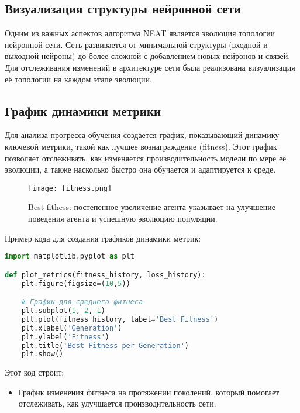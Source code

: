\documentclass[a4paper,12pt]{article}
\begin{document}
\subsection{Визуализация структуры нейронной сети}

Одним из важных аспектов алгоритма NEAT является эволюция топологии нейронной сети. Сеть развивается от минимальной структуры (входной и выходной нейроны) до более сложной с добавлением новых нейронов и связей. Для отслеживания изменений в архитектуре сети была реализована визуализация её топологии на каждом этапе эволюции.

\subsection{График динамики метрики}

Для анализа прогресса обучения создается график, показывающий динамику ключевой метрики, такой как лучшее вознаграждение (fitness). Этот график позволяет отслеживать, как изменяется производительность модели по мере её эволюции, а также насколько быстро она обучается и адаптируется к среде.

\begin{figure}[H]
	\centering
	\texttt{[image: fitness.png]}
	\caption{Best fithess: постепенное увеличение агента указывает на улучшение поведения агента и успешную эволюцию популяции.}
	\label{fig:best_fitness}
\end{figure}

Пример кода для создания графиков динамики метрик:

\begin{lstlisting}[language=Python]
import matplotlib.pyplot as plt

def plot_metrics(fitness_history, loss_history):
    plt.figure(figsize=(10,5))

    # График для среднего фитнеса
    plt.subplot(1, 2, 1)
    plt.plot(fitness_history, label='Best Fitness')
    plt.xlabel('Generation')
    plt.ylabel('Fitness')
    plt.title('Best Fitness per Generation')
    plt.show()
\end{lstlisting}

Этот код строит:
\begin{itemize}
    \item График изменения фитнеса на протяжении поколений, который помогает отслеживать, как улучшается производительность сети.

\end{itemize}
\end{document}
